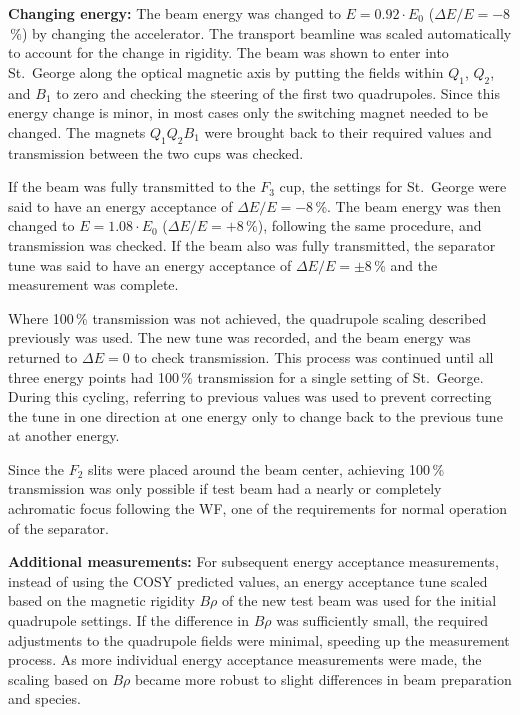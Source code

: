 \textbf{Changing energy:}
The beam energy was changed to $E = 0.92 \cdot E_0$
($\Delta E/E = -8$\,\%) by changing the accelerator. The transport
beamline was scaled automatically to account for the change in rigidity.
The beam was shown to enter into St.\ George along the optical magnetic
axis by putting the fields within $Q_1$, $Q_2$, and $B_1$ to zero and
checking the steering of the first two quadrupoles. Since this energy
change is minor, in most cases only the switching magnet needed to be
changed. The magnets $Q_1Q_2B_1$ were brought back to their required
values and transmission between the two cups was checked.

If the beam was fully transmitted to the $F_3$ cup, the settings for
St.\ George were said to have an energy acceptance of $\Delta E/E =
-8$\,\%. The beam energy was then changed to $E = 1.08 \cdot E_0$
($\Delta E/E = + 8$\,\%), following the same procedure, and transmission
was checked. If the beam also was fully transmitted, the separator tune
was said to have an energy acceptance of $\Delta E/E = \pm 8$\,\% and
the measurement was complete.

Where 100\,\% transmission was not achieved, the quadrupole scaling
described previously was used. The new tune was recorded, and the beam
energy was returned to $\Delta E = 0$ to check transmission. This
process was continued until all three energy points had 100\,\%
transmission for a single setting of St.\ George. During this cycling,
referring to previous values was used to prevent correcting the tune in
one direction at one energy only to change back to the previous tune at
another energy.

Since the $F_2$ slits were placed around the beam center, achieving
100\,\% transmission was only possible if test beam had a nearly or
completely achromatic focus following the WF, one of the requirements
for normal operation of the separator.

\textbf{Additional measurements:}
For subsequent energy acceptance measurements, instead of using the COSY
predicted values, an energy acceptance tune scaled based on the magnetic
rigidity $B\rho$ of the new test beam was used for the initial
quadrupole settings. If the difference in $B\rho$ was sufficiently
small, the required adjustments to the quadrupole fields were minimal,
speeding up the measurement process. As more individual energy
acceptance measurements were made, the scaling based on $B\rho$ became
more robust to slight differences in beam preparation and species.

